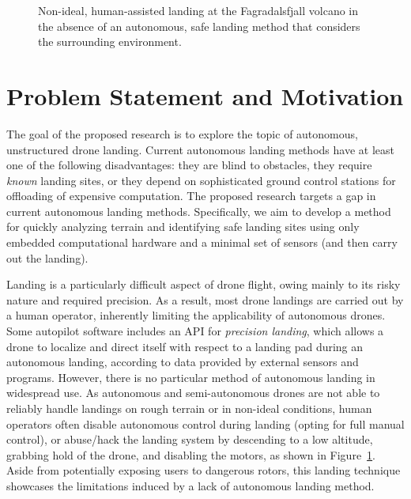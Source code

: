\begin{figure}[ht]
    \centering
    \begin{minipage}{\wd0}
      \caption{Non-ideal, human-assisted landing at the Fagradalsfjall volcano in the absence of an autonomous, safe landing method that considers the surrounding environment.}
      \label{figure:hand_landing}
    \end{minipage}
\end{figure}

\section{Problem Statement and Motivation}

The goal of the proposed research is to explore the topic of
autonomous, unstructured drone landing.
Current autonomous landing methods have at least one of the following disadvantages:
they are blind to obstacles,
they require \textit{known} landing sites,
or they depend on sophisticated ground control stations for offloading of expensive computation.
The proposed research targets a gap in current autonomous landing methods.
Specifically, we aim to develop a method for quickly analyzing terrain
and identifying safe landing sites using only embedded computational hardware
and a minimal set of sensors (and then carry out the landing).

Landing is a particularly difficult aspect of drone flight,
owing mainly to its risky nature and required precision.
As a result, most drone landings are carried out by a human operator,
inherently limiting the applicability of autonomous drones.
Some autopilot software includes an API for \textit{precision landing},
which allows a drone to localize and direct itself with respect to a landing pad during an autonomous landing,
according to data provided by external sensors and programs.
However, there is no particular method of autonomous landing in widespread use.
As autonomous and semi-autonomous drones are not able to reliably handle landings
on rough terrain or in non-ideal conditions, human operators often disable
autonomous control during landing (opting for full manual control),
or abuse/hack the landing system by descending to a low altitude,
grabbing hold of the drone,
and disabling the motors,
as shown in Figure~\ref{figure:hand_landing}.
Aside from potentially exposing users to dangerous rotors,
this landing technique showcases the limitations induced by a lack of
autonomous landing method.

